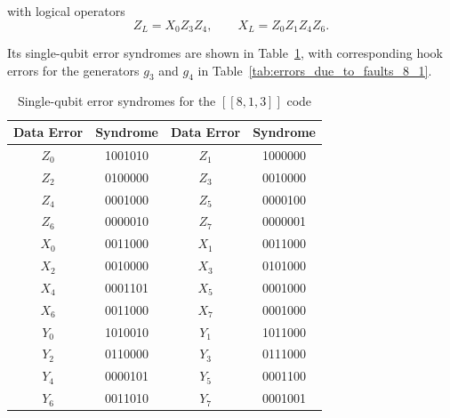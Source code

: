 \documentclass[reprint, amsmath,amssymb, aps,pra,
 floatfix,
]{revtex4-2}
\newcommand{\PadCell}[1]{\kern8pt#1\kern8pt}
\newcommand{\PadCellColor}[2]{\cellcolor{#1}\kern8pt#2\kern8pt}
\begin{document}
\noindent with logical operators
\[
Z_L = X_0 Z_3 Z_4, \qquad X_L = Z_0 Z_1Z_4Z_6.
\]


\noindent Its single-qubit error syndromes are shown in Table~\ref{tab:errors_due_to_faults_8}, with corresponding hook errors for the generators $g_3$ and $g_4$ in Table~\ref {tab:errors_due_to_faults_8_1}. 

\begin{table}[h]
\centering
\scriptsize
  \setlength{\tabcolsep}{0pt} %
  \renewcommand{\arraystretch}{1.2} %

  \begin{tabular}{|c|c|c|c|}
    \hline
    \textbf{Data Error}  & \textbf{ Syndrome } & \textbf{ Data Error } & \textbf{ Syndrome } \\ \hline


    \rowcolor{gray!10}
    $Z_0$  & 1001010  & $Z_1$    &  1000000      \\ \hline
    $Z_2$  & 0100000  & $Z_3$    &  0010000      \\ \hline

    \rowcolor{gray!10}
    $Z_4$  & 0001000  & $Z_5$    &  0000100      \\ \hline
    $Z_6$  & 0000010  & $Z_7$    &  0000001      \\ \hline

    \rowcolor{gray!10}
    $X_0$    &  0011000      & $X_1$  & 0011000  \\ \hline 
    $X_2$    &  0010000      & $X_3$  & 0101000 \\ \hline

    \rowcolor{gray!10}
    $X_4$    & 0001101      & $X_5$  & 0001000    \\ \hline
    $X_6$    &  0011000     & $X_7$  & 0001000   \\ \hline

    \rowcolor{gray!10}
    $Y_0$  & 1010010  & $Y_1$    &  1011000      \\ \hline
    $Y_2$  & 0110000  & $Y_3$    &  0111000      \\ \hline
    

    \rowcolor{gray!10}
    $Y_4$  & 0000101  & $Y_5$    &  0001100     \\ \hline
    $Y_6$  & 0011010  & $Y_7$    &   0001001     \\ \hline

  \end{tabular}
\caption{Single-qubit error syndromes for the $[[8,1,3]]$ code}
\label{tab:errors_due_to_faults_8}
\end{table}
\end{document}

